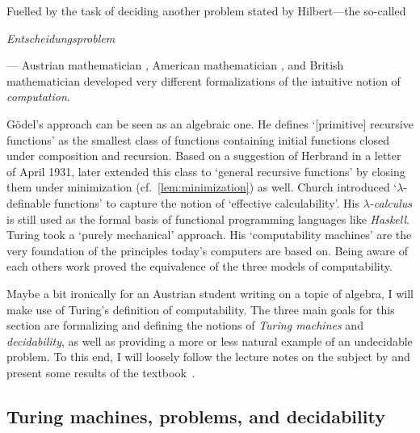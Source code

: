 %

Fuelled by the task of deciding another problem stated by Hilbert---the
so-called \begin{german}\emph{Entscheidungsproblem}\end{german}--- Austrian
mathematician \textcite{Goedel1931}, American mathematician
\textcite{Church1936a,Church1936}, and British mathematician
\textcite{Turing1936} developed very different formalizations of the intuitive
notion of \emph{computation}.

Gödel's approach can be seen as an algebraic one. He defines ‘[primitive]
recursive functions’ as the smallest class of functions containing initial
functions closed under composition and recursion. Based on a suggestion of
Herbrand in a letter of April 1931, \textcite{Goedel1934} later extended this
class to ‘general recursive functions’ by closing them under minimization
(cf.~\cref{lem:minimization}) as well. Church introduced ‘\(λ\)-definable
functions’ to capture the notion of ‘effective calculability’. His
\emph{\(λ\)-calculus} is still used as the formal basis of functional
programming languages like \emph{Haskell}. Turing took a ‘purely mechanical’
approach. His ‘computability machines’ are the very foundation of the principles
today's computers are based on. Being aware of each others work
\textcite{Church1936,Kleene1936,Turing1936} proved the equivalence of the three
models of computability.

Maybe a bit ironically for an Austrian student writing on a topic of algebra, I
will make use of Turing's definition of computability. The three main goals for
this section are formalizing and defining the notions of \emph{Turing machines}
and \emph{decidability}, as well as providing a more or less natural example of
an undecidable problem. To this end, I will loosely follow the lecture notes on
the subject by \textcite{Mueller2016} and present some results of the
textbook~\cite{Cooper2004}.

\subsection{Turing machines, problems, and decidability}


